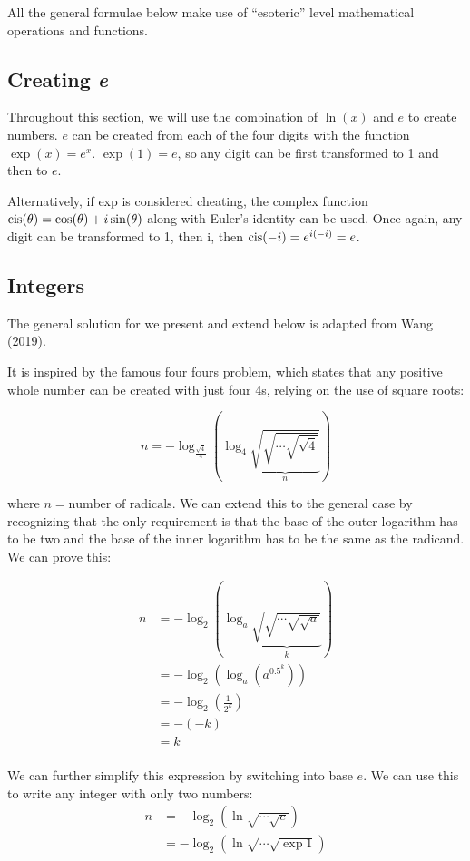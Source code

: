 All the general formulae below make use of ``esoteric'' level mathematical operations and functions.

\subsection{Creating \emph{e}}
Throughout this section, we will use the combination of $\ln(x)$ and $e$ to create numbers.
$e$ can be created from each of the four digits with the function $\exp(x)=e^x$.
$\exp(1)=e$, so any digit can be first transformed to 1 and then to $e$.

Alternatively, if exp is considered cheating, the complex function $\operatorname{cis}(\theta)=\cos(\theta)+i\sin(\theta)$ along with Euler's identity can be used. 
Once again, any digit can be transformed to 1, then i, then $\operatorname{cis}(-i)=e^{i(-i)}=e$.

\subsection{Integers}

The general solution for we present and extend below is adapted from Wang (2019).

It is inspired by the famous four fours problem, which states that any positive whole number can be created with just four 4s, relying on the use of square roots:

\begin{equation}
  n = -\log_\frac{\sqrt{4}}{4}\left( \log_4 \underbrace{\sqrt{\sqrt{\cdots\sqrt{\sqrt{4}}}}}_{n} \right)
\end{equation}

where $n=\textrm{number of radicals}$.
We can extend this to the general case by recognizing that the only requirement is that the base of the outer logarithm has to be two and the base of the inner logarithm has to be the same as the radicand.
We can prove this:

\begin{align*}
  n &= -\log_2\left(\log_a \underbrace{\sqrt{\sqrt{\cdots\sqrt{\sqrt{a}}}}}_{k} \right) \\
  &= -\log_2\left(\log_a \left(a^{0.5^k}\right)\right) \\
  &= -\log_2\left(\frac{1}{2^k}\right) \\
  &= -(-k) \\
  &= k \\
\end{align*}

We can further simplify this expression by switching into base $e$.
We can use this to write any integer with only two numbers:
\begin{align*}
  n &= -\log_2\left( \ln \sqrt{\cdots\sqrt{e}}\right) \\
  &= -\log_2\left( \ln \sqrt{\cdots\sqrt{\exp1}}\right)
\end{align*}

